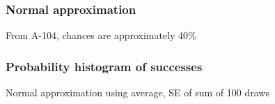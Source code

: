 \documentclass[handout]{beamer}
\begin{document}


   \begin{frame}
   \frametitle{Normal approximation}
   \begin{center}
   \end{center}
   From A-104, chances are approximately 40\%
   \end{frame}



   \begin{frame}
   \frametitle{Probability histogram of successes}
   \begin{center}
   \end{center}
   Normal approximation using average, SE of sum of 100 draws
   \end{frame}
\end{document}
